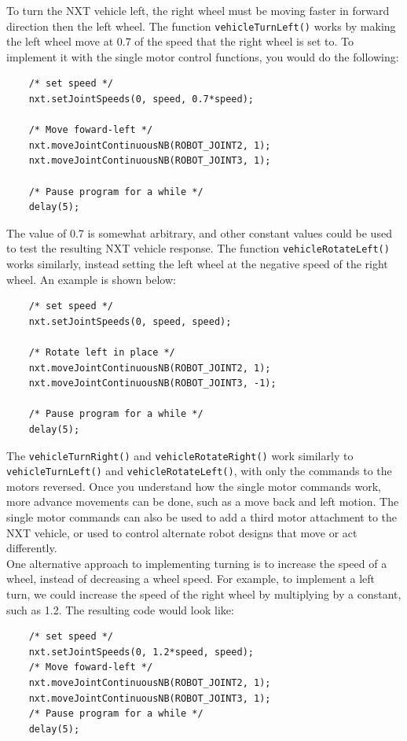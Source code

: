 \noindent
To turn the NXT vehicle left, the right wheel must be moving faster in forward direction then the 
left wheel.  The function \verb+vehicleTurnLeft()+ works by making the left wheel move at 0.7 of the 
speed that the right wheel is set to. To implement it with the single motor control functions, you 
would do the following:
\begin{verbatim}
    /* set speed */
    nxt.setJointSpeeds(0, speed, 0.7*speed);

    /* Move foward-left */
    nxt.moveJointContinuousNB(ROBOT_JOINT2, 1);
    nxt.moveJointContinuousNB(ROBOT_JOINT3, 1);

    /* Pause program for a while */
    delay(5);
\end{verbatim}
\noindent
The value of 0.7 is somewhat arbitrary, and other constant values could be used to test the resulting
NXT vehicle response. The function \verb+vehicleRotateLeft()+ works similarly, instead setting the 
left wheel at the negative speed of the right wheel. An example is shown below:
\begin{verbatim}
    /* set speed */
    nxt.setJointSpeeds(0, speed, speed);

    /* Rotate left in place */
    nxt.moveJointContinuousNB(ROBOT_JOINT2, 1);
    nxt.moveJointContinuousNB(ROBOT_JOINT3, -1);

    /* Pause program for a while */
    delay(5);
\end{verbatim}
\noindent
The \verb+vehicleTurnRight()+ and \verb+vehicleRotateRight()+ work similarly to \verb+vehicleTurnLeft()+
and \verb+vehicleRotateLeft()+, with only the commands to the motors reversed. Once you understand 
how the single motor commands work, more advance movements can be done, such as a move back and left 
motion.  The single motor commands can also be used to add a third motor attachment to the NXT 
vehicle, or used to control alternate robot designs that move or act differently.\\
\newline
\noindent
One alternative approach to implementing turning is to increase the speed of a wheel, instead of 
decreasing a wheel speed. For example, to implement a left turn, we could increase the speed of 
the right wheel by multiplying by a constant, such as 1.2.  The resulting code would look like:
\begin{verbatim}
    /* set speed */
    nxt.setJointSpeeds(0, 1.2*speed, speed);
    /* Move foward-left */
    nxt.moveJointContinuousNB(ROBOT_JOINT2, 1);
    nxt.moveJointContinuousNB(ROBOT_JOINT3, 1);
    /* Pause program for a while */
    delay(5);
\end{verbatim}
